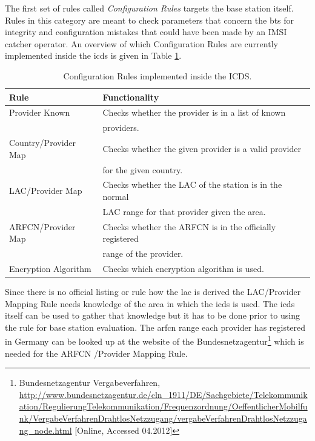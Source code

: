 The first set of rules called \emph{Configuration Rules} targets the base station itself.
Rules in this category are meant to check parameters that concern the \gls{bts} for integrity and configuration mistakes that could have been made by an IMSI catcher operator.
An overview of which Configuration Rules are currently implemented inside the \gls{icds} is given in Table \ref{tab:config_rules}.
\begin{table}
\centering
\begin{tabular}{ll}
\toprule
Rule					&Functionality\\
\midrule
Provider Known			&Checks whether the provider is in a list of known \\
						&providers.\\
Country/Provider Map	&Checks whether the given provider is a valid provider\\
						&for the given country.\\
LAC/Provider Map		&Checks whether the LAC of the station is in the normal\\
						&LAC range for that provider given the area.\\
ARFCN/Provider Map		&Checks whether the ARFCN is in the officially registered\\
						&range of the provider.\\
Encryption Algorithm	&Checks which encryption algorithm is used.\\
\bottomrule
\end{tabular}
\caption{Configuration Rules implemented inside the ICDS.}
\label{tab:config_rules}
\end{table}
Since there is no official listing or rule how the \gls{lac} is derived the LAC/Provider Mapping Rule needs knowledge of the area in which the \gls{icds} is used.
The \gls{icds} itself can be used to gather that knowledge but it has to be done prior to using the rule for base station evaluation. 
The \gls{arfcn} range each provider has registered in Germany can be looked up at the website of the Bundesnetzagentur\footnote{Bundesnetzagentur Vergabeverfahren, \url{http://www.bundesnetzagentur.de/cln_1911/DE/Sachgebiete/Telekommunikation/RegulierungTelekommunikation/Frequenzordnung/OeffentlicherMobilfunk/VergabeVerfahrenDrahtlosNetzzugang/vergabeVerfahrenDrahtlosNetzzugang_node.html} [Online, Accessed 04.2012]} which is needed for the ARFCN /Provider Mapping Rule.


